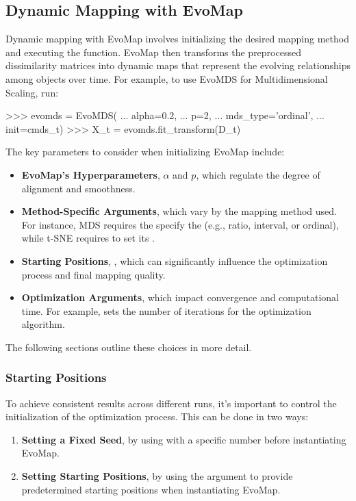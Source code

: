 \documentclass[article]{jss}
\begin{document}
\subsection{Dynamic Mapping with EvoMap}

Dynamic mapping with EvoMap involves initializing the desired mapping method and executing the  
function. EvoMap then transforms the preprocessed dissimilarity matrices into dynamic maps that represent the evolving 
relationships among objects over time. For example, to use EvoMDS for Multidimensional Scaling, run:

\begin{Code}
>>> evomds = EvoMDS(
...     alpha=0.2, 
...     p=2, 
...     mds_type='ordinal', 
...     init=cmds_t)                  
>>> X_t = evomds.fit_transform(D_t)    
\end{Code}

The key parameters to consider when initializing EvoMap include:
\begin{itemize}
  \item \textbf{EvoMap's Hyperparameters}, $\alpha$ and $p$, which regulate the degree of alignment and smoothness.
  \item \textbf{Method-Specific Arguments}, which vary by the mapping method used. For instance, MDS requires the specify the  %
  (e.g., ratio, interval, or ordinal), while t-SNE requires to set its . 
  \item \textbf{Starting Positions}, , which can significantly influence the optimization process and final %
  mapping quality. 
  \item \textbf{Optimization Arguments}, which impact convergence and computational time. For example,  %
  sets the number of iterations for the optimization algorithm.  
\end{itemize}

The following sections outline these choices in more detail. 

\subsubsection{Starting Positions}

To achieve consistent results across different runs, it's important to control the initialization of the optimization 
process. This can be done in two ways:

\begin{enumerate}
    \item \textbf{Setting a Fixed Seed}, by using  with a specific number before instantiating EvoMap.
    \item \textbf{Setting Starting Positions}, by using the  argument to provide predetermined starting positions when %
    instantiating EvoMap.
\end{enumerate}
\end{document}
